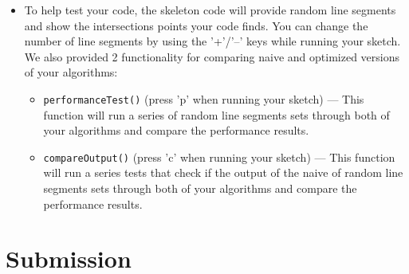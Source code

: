 \documentclass[a4paper,12pt]{article}
\begin{document}
\begin{itemize}
\newpage

\item To help test your code, the skeleton code will provide random line segments and show the intersections points your code finds. You can change the number of line segments by using the '+'/'--' keys while running your sketch. We also provided 2 functionality for comparing naive and optimized versions of your algorithms:


\begin{itemize}

   \item \texttt{performanceTest()} (press 'p' when running your sketch) --- This function will run a series of random line segments sets through both of your algorithms and compare the performance results.

   \item \texttt{compareOutput()} (press 'c' when running your sketch) --- This function will run a series tests that check if the output of the naive of random line segments sets through both of your algorithms and compare the performance results.

   
\end{itemize}
\end{itemize}



\section{Submission}

\end{document}
